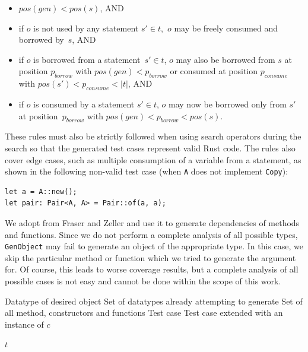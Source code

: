 \documentclass[paper=a4,%
  twoside,%
  BCOR4mm,%
  abstract=true,%
  toc=bibliography,%
  chapterprefix=true,%
  toc=bibliographynumbered,%
  open=right,%
  english,%
  pagesize=pdftex]{scrreprt}
\newcommand{\Desc}[2]{\State \makebox[2em][l]{#1}#2}
\begin{document}
\begin{itemize}
    \item $pos(gen) < pos(s)$, AND
    \item if $o$ is not used by any statement $s' \in t$,~$o$ may be freely consumed and borrowed by~$s$, AND
    \item if $o$ is borrowed from a statement~$s' \in t$, $o$ may also be borrowed from $s$ at position $p_{borrow}$ with $pos(gen) < p_{borrow}$ or consumed at position $p_{consume}$ with $pos(s') < p_{consume} < \left|t\right|$, AND
    \item if $o$ is consumed by a statement $s' \in t$, $o$ may now be borrowed only from $s'$ at position~$p_{borrow}$ with $pos(gen) < p_{borrow} < pos(s)$.
\end{itemize}

These rules must also be strictly followed when using search operators during the search so that the generated test cases represent valid Rust code. The rules also cover edge cases, such as multiple consumption of a variable from a statement, as shown in the following non-valid test case (when \texttt{A} does not implement \texttt{Copy}):
\begin{lstlisting}[style=boxed, caption={}]
let a = A::new();
let pair: Pair<A, A> = Pair::of(a, a);
\end{lstlisting}

We adopt  from Fraser and Zeller and use it to generate dependencies of methods and functions. Since we do not perform a complete analysis of all possible types, \texttt{GenObject} may fail to generate an object of the appropriate type. In this case, we skip the particular method or function which we tried to generate the argument for. Of course, this leads to worse coverage results, but a complete analysis of all possible cases is not easy and cannot be done within the scope of this work.

\begin{algorithm}[t]
\caption{$GenObject(c, G, M, t)$}
\label{alg:genobject}
\begin{algorithmic}
\Input
  \Desc{$c$}{Datatype of desired object}
  \Desc{$G$}{Set of datatypes already attempting to generate}
  \Desc{$M$}{Set of all method, constructors and functions}
  \Desc{$t$}{Test case}
\EndInput
\Output
  \Desc{$t$}{Test case extended with an instance of $c$}
\EndOutput
{}

  \EndIf
\EndFor
{}
\State \Return $t$
\end{algorithmic}
\end{algorithm}
\end{document}

